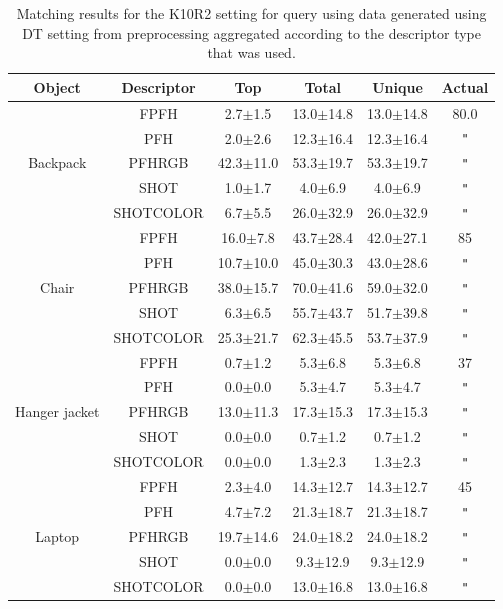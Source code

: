\documentclass[11pt,a4paper]{kth-mag}
\renewcommand{\textquotedbl}{\texttt{"}}
\newcommand{\ditto}[1][.4pt]{\xrfill{#1}~\textquotedbl~\xrfill{#1}}
\begin{document}
\begin{table}[H]
  \begin{tabular}{cc|cccc}
    Object & Descriptor & Top & Total & Unique & Actual \\\hline
    \multirow{5}{*}{Backpack} & FPFH & 2.7$\pm$1.5 & 13.0$\pm$14.8 & 13.0$\pm$14.8 & 80.0\\
           & PFH & 2.0$\pm$2.6 & 12.3$\pm$16.4 & 12.3$\pm$16.4 & \ditto\\
           & PFHRGB & 42.3$\pm$11.0 & 53.3$\pm$19.7 & 53.3$\pm$19.7 & \ditto\\
           & SHOT & 1.0$\pm$1.7 & 4.0$\pm$6.9 & 4.0$\pm$6.9 & \ditto\\
           & SHOTCOLOR & 6.7$\pm$5.5 & 26.0$\pm$32.9 & 26.0$\pm$32.9 & \ditto\\\hline
    \multirow{5}{*}{Chair} & FPFH & 16.0$\pm$7.8 & 43.7$\pm$28.4 & 42.0$\pm$27.1 & 85\\
           & PFH & 10.7$\pm$10.0 & 45.0$\pm$30.3 & 43.0$\pm$28.6 & \ditto\\
           & PFHRGB & 38.0$\pm$15.7 & 70.0$\pm$41.6 & 59.0$\pm$32.0 & \ditto\\
           & SHOT & 6.3$\pm$6.5 & 55.7$\pm$43.7 & 51.7$\pm$39.8 & \ditto \\
           & SHOTCOLOR & 25.3$\pm$21.7 & 62.3$\pm$45.5 & 53.7$\pm$37.9 & \ditto\\\hline
    \multirow{5}{*}{Hanger jacket} & FPFH & 0.7$\pm$1.2 & 5.3$\pm$6.8 & 5.3$\pm$6.8 & 37\\
           & PFH & 0.0$\pm$0.0 & 5.3$\pm$4.7 & 5.3$\pm$4.7 & \ditto\\
           & PFHRGB & 13.0$\pm$11.3 & 17.3$\pm$15.3 & 17.3$\pm$15.3 & \ditto\\
           & SHOT & 0.0$\pm$0.0 & 0.7$\pm$1.2 & 0.7$\pm$1.2 & \ditto \\
           & SHOTCOLOR & 0.0$\pm$0.0 & 1.3$\pm$2.3 & 1.3$\pm$2.3 & \ditto\\\hline
    \multirow{5}{*}{Laptop} & FPFH & 2.3$\pm$4.0 & 14.3$\pm$12.7 & 14.3$\pm$12.7 & 45\\
           & PFH & 4.7$\pm$7.2 & 21.3$\pm$18.7 & 21.3$\pm$18.7 & \ditto \\
           & PFHRGB & 19.7$\pm$14.6 & 24.0$\pm$18.2 & 24.0$\pm$18.2 & \ditto\\
           & SHOT & 0.0$\pm$0.0 & 9.3$\pm$12.9 & 9.3$\pm$12.9 & \ditto \\
           & SHOTCOLOR & 0.0$\pm$0.0 & 13.0$\pm$16.8 & 13.0$\pm$16.8 & \ditto \\
  \end{tabular}
    \caption{Matching results for the K10R2 setting for query using data generated
      using DT setting from preprocessing aggregated according to the descriptor
      type that was used.}
    \label{tbl:feature_k10r2}
\end{table}
\end{document}

